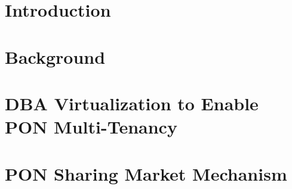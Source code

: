 \documentclass[11pt,a4paper,oneside,openright]{report}
\begin{document}
%





\cleardoublepage
{}%

%

\cleardoublepage {}








\listoftodos[TODO]
\clearpage
\begingroup
\hypersetup{linkcolor=black}
\tableofcontents
\clearpage
\listoffigures
\clearpage
\listoftables
\endgroup


\cleardoublepage%
%
\setlength{\parskip}{1ex plus 0.5ex minus 0.2ex} %

\chapter{Introduction}
\label{cpt:introduction}\acresetall%


\chapter{Background}
\label{cpt:background}\acresetall%


% 

\chapter{DBA Virtualization to Enable PON Multi-Tenancy}
\label{cpt:chapter_1}\acresetall%


\chapter{PON Sharing Market Mechanism}
\label{cpt:chapter_2}\acresetall%

\end{document}
